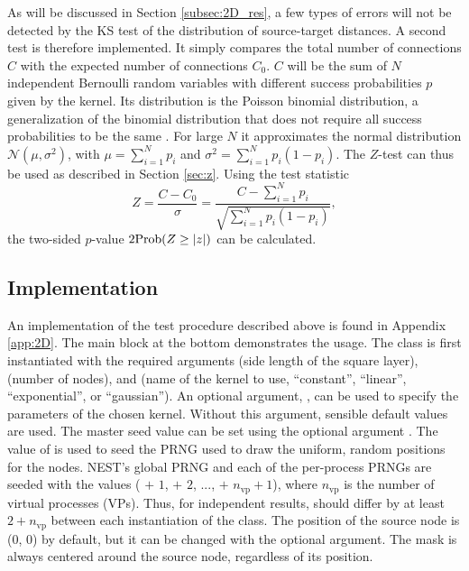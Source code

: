As will be discussed in Section \ref{subsec:2D_res}, a few types of errors will not be detected by the KS test of the distribution of source-target distances. A second test is therefore implemented. It simply compares the total number of connections $C\label{C_spatial}$ with the expected number of connections $C_0\label{C_spatial0}$. $C$ will be the sum of $N$ independent Bernoulli random variables with different success probabilities $p$ given by the kernel. Its distribution is the Poisson binomial distribution, a generalization of the binomial distribution that does not require all success probabilities to be the same . For large $N$ it approximates the normal distribution $\mathcal{N}(\mu, \sigma^2)$, with $\mu = \sum_{i=1}^N{p_i}$ and $\sigma^2 = \sum_{i=1}^N{p_i(1-p_i)}$. 
The $Z$-test can thus be used as described in Section \ref{sec:z}. Using the test statistic
\begin{equation}
Z = \frac{C - C_0}{\sigma} = \frac{C - \sum_{i=1}^N{p_i}}{\sqrt{\sum_{i=1}^N{p_i(1-p_i)}}},
\end{equation}
the two-sided $p$-value $2\text{Prob}\!\left(Z \ge \lvert z \rvert\right)$ can be calculated. 




\subsection{Implementation\label{subsec:2Dimp}}

An implementation of the test procedure described above is found in Appendix \ref{app:2D}. The main block at the bottom demonstrates the usage. The class  is first instantiated with the required arguments  (side length of the square layer),  (number of nodes), and  (name of the kernel to use, ``constant'', ``linear'', ``exponential'', or ``gaussian''). An optional argument, , can be used to specify the parameters of the chosen kernel. Without this argument, sensible default values are used. The master seed value can be set using the optional argument . The value of  is used to seed the PRNG used to draw the uniform, random positions for the nodes. NEST's global PRNG and each of the per-process PRNGs are seeded with the values ( $+$ $1$,  $+$ $2$, ...,  $+$ $n_\text{vp}+1$), where $n_\text{vp}$ is the number of virtual processes (VPs). Thus, for independent results,  should differ by at least $2+n_\text{vp}$ between each instantiation of the class. The position of the source node is (0, 0) by default, but it can be changed with the optional  argument. The mask is always centered around the source node, regardless of its position. 


